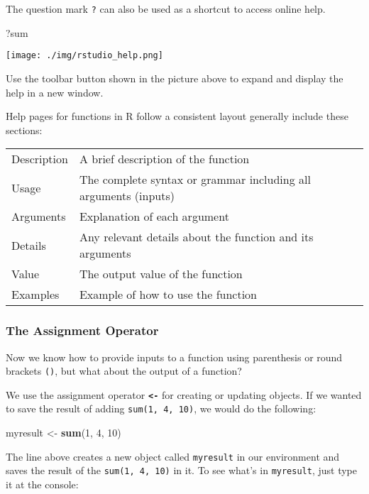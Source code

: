 \documentclass[]{article}
\newenvironment{Shaded}{\begin{snugshade}}{\end{snugshade}}
\newcommand{\DecValTok}[1]{\textcolor[rgb]{0.00,0.00,0.81}{#1}}
\newcommand{\KeywordTok}[1]{\textcolor[rgb]{0.13,0.29,0.53}{\textbf{#1}}}
\newcommand{\NormalTok}[1]{#1}
\newcommand{\StringTok}[1]{\textcolor[rgb]{0.31,0.60,0.02}{#1}}
\begin{document}
The question mark \texttt{?} can also be used as a shortcut to access online help.

\begin{Shaded}
\begin{Highlighting}[]
\NormalTok{?sum}
\end{Highlighting}
\end{Shaded}

\texttt{[image: ./img/rstudio\_help.png]}

Use the toolbar button shown in the picture above to expand and display the help in a new window.

Help pages for functions in R follow a consistent layout generally include these sections:

\begin{longtable}[]{@{}ll@{}}
\toprule
\endhead
Description & A brief description of the function\tabularnewline
Usage & The complete syntax or grammar including all arguments (inputs)\tabularnewline
Arguments & Explanation of each argument\tabularnewline
Details & Any relevant details about the function and its arguments\tabularnewline
Value & The output value of the function\tabularnewline
Examples & Example of how to use the function\tabularnewline
\bottomrule
\end{longtable}

\hypertarget{the-assignment-operator}{%
\subsubsection{The Assignment Operator}\label{the-assignment-operator}}

Now we know how to provide inputs to a function using parenthesis or round brackets \texttt{()}, but what about the output of a function?

We use the assignment operator \textbf{\texttt{\textless{}-}} for creating or updating objects. If we wanted to save the result of adding \texttt{sum(1,\ 4,\ 10)}, we would do the following:

\begin{Shaded}
\begin{Highlighting}[]
\NormalTok{myresult <-}\StringTok{ }\KeywordTok{sum}\NormalTok{(}\DecValTok{1}\NormalTok{, }\DecValTok{4}\NormalTok{, }\DecValTok{10}\NormalTok{)}
\end{Highlighting}
\end{Shaded}

The line above creates a new object called \texttt{myresult} in our environment and saves the result of the \texttt{sum(1,\ 4,\ 10)} in it. To see what's in \texttt{myresult}, just type it at the console:
\end{document}
